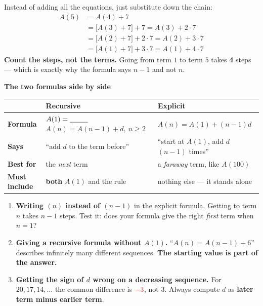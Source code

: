\documentclass[11pt]{article}
\newcommand{\vans}[1]{\textbf{\textcolor{ink}{#1}}}
\newcommand{\mneg}[1]{\textcolor{crim}{#1}}
\begin{document}
\begin{notebox}
Instead of adding all the equations, just substitute down the chain:
\begin{align*}
A(5)&=A(4)+7\\
&=\big[A(3)+7\big]+7 = A(3)+2\cdot7\\
&=\big[A(2)+7\big]+2\cdot 7 = A(2)+3\cdot 7\\
&=\big[A(1)+7\big]+3\cdot 7 = A(1)+4\cdot 7
\end{align*}
\vans{Count the steps, not the terms.} Going from term $1$ to term $5$ takes \textbf{4} steps ---
which is exactly why the formula says $n-1$ and not $n$.
\end{notebox}

\begin{center}
\begin{tcolorbox}[colback=inkpale,colframe=ink,width=0.97\linewidth,arc=3pt,boxrule=1.1pt]
{\color{ink}\bfseries\large The two formulas side by side}\par\vspace{4pt}
\renewcommand{\arraystretch}{1.5}
\begin{center}
\begin{tabular}{@{}p{3.3cm} p{5.2cm} p{5.8cm}@{}}
& \textbf{Recursive} & \textbf{Explicit} \\ \hline
\textbf{Formula} & $A(1)=\underline{\hspace{0.9cm}}$ \newline
 $A(n)=A(n-1)+d,\ n\ge2$ & $A(n)=A(1)+(n-1)d$ \\
\textbf{Says} & ``add $d$ to the term before'' & ``start at $A(1)$, add $d$ \ $(n-1)$ times'' \\
\textbf{Best for} & the \emph{next} term & a \emph{faraway} term, like $A(100)$ \\
\textbf{Must include} & \textbf{both} $A(1)$ and the rule & nothing else --- it stands alone \\
\end{tabular}
\end{center}
\end{tcolorbox}
\end{center}

\begin{warnbox}
\begin{enumerate}[leftmargin=1.7em,nosep,itemsep=3pt]
\item \textbf{Writing $(n)$ instead of $(n-1)$} in the explicit formula. Getting to term $n$ takes
$n-1$ steps. Test it: does your formula give the right \emph{first} term when $n=1$?
\item \textbf{Giving a recursive formula without $A(1)$.} ``$A(n)=A(n-1)+6$'' describes infinitely
many different sequences. \vans{The starting value is part of the answer.}
\item \textbf{Getting the sign of $d$ wrong on a decreasing sequence.} For $20,17,14,\ldots$ the
common difference is $\mneg{-3}$, not $3$. Always compute $d$ as \textbf{later term minus earlier
term}.
\end{enumerate}
\end{warnbox}
\end{document}
